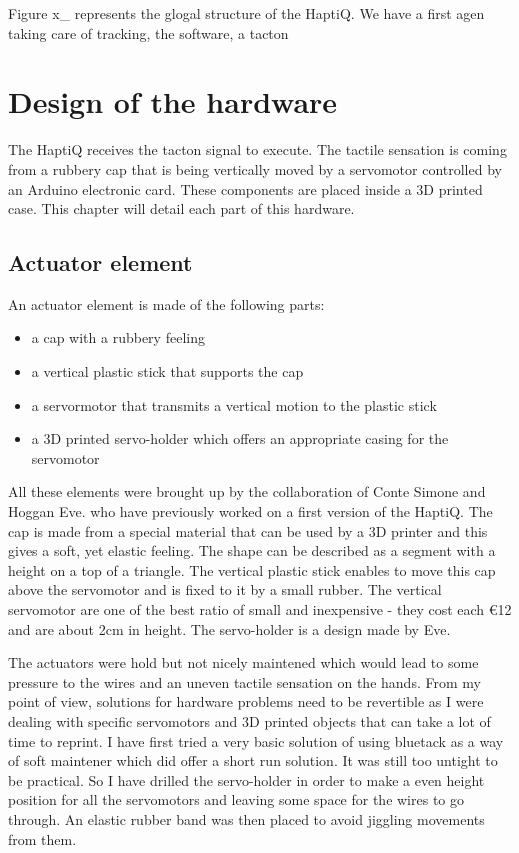 Figure x\_ represents the glogal structure of the HaptiQ. We have a
first agen taking care of tracking, the software, a tacton

\section{Design of the hardware}\label{design-of-the-hardware}

The HaptiQ receives the tacton signal to execute. The tactile sensation
is coming from a rubbery cap that is being vertically moved by a
servomotor controlled by an Arduino electronic card. These components
are placed inside a 3D printed case. This chapter will detail each part
of this hardware.

\subsection{Actuator element}\label{actuator-element}

An actuator element is made of the following parts:

\begin{itemize}
\item
  a cap with a rubbery feeling
\item
  a vertical plastic stick that supports the cap
\item
  a servormotor that transmits a vertical motion to the plastic stick
\item
  a 3D printed servo-holder which offers an appropriate casing for the
  servomotor
\end{itemize}

All these elements were brought up by the collaboration of Conte Simone
and Hoggan Eve. who have previously worked on a first version of the
HaptiQ. The cap is made from a special material that can be used by a 3D
printer and this gives a soft, yet elastic feeling. The shape can be
described as a segment with a height on a top of a triangle. The
vertical plastic stick enables to move this cap above the servomotor and
is fixed to it by a small rubber. The vertical servomotor are one of the
best ratio of small and inexpensive - they cost each \euro{12} and are
about 2cm in height. The servo-holder is a design made by Eve.

The actuators were hold but not nicely maintened which would lead to
some pressure to the wires and an uneven tactile sensation on the hands.
From my point of view, solutions for hardware problems need to be
revertible as I were dealing with specific servomotors and 3D printed
objects that can take a lot of time to reprint. I have first tried a
very basic solution of using bluetack as a way of soft maintener which
did offer a short run solution. It was still too untight to be
practical. So I have drilled the servo-holder in order to make a even
height position for all the servomotors and leaving some space for the
wires to go through. An elastic rubber band was then placed to avoid
jiggling movements from them.

